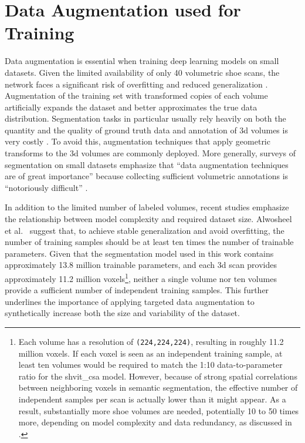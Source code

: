 \section{Data Augmentation used for Training}
Data augmentation is essential when training deep learning models on small datasets. Given the limited availability of only 40 volumetric shoe scans, the network faces a significant risk of overfitting and reduced generalization \cite{HaoDataAugmentation}. Augmentation of the training set with transformed copies of each volume artificially expands the dataset and better approximates the true data distribution. Segmentation tasks in particular usually rely heavily on both the quantity and the quality of ground truth data and annotation of \gls{3d} volumes is very costly \cite{SutassananonDataAugmentation}. To avoid this, augmentation techniques that apply geometric transforms to the \gls{3d} volumes are commonly deployed. More generally, surveys of segmentation on small datasets emphasize that \enquote{data augmentation techniques are of great importance} because collecting sufficient volumetric annotations is \enquote{notoriously difficult} \cite{AlomarDataAugmentation}.

\medskip

In addition to the limited number of labeled volumes, recent studies emphasize the relationship between model complexity and required dataset size. Alwosheel et al.~\cite{ALWOSHEEL2018167} suggest that, to achieve stable generalization and avoid overfitting, the number of training samples should be at least ten times the number of trainable parameters. Given that the segmentation model used in this work contains approximately 13.8 million trainable parameters, and each \gls{3d} scan provides approximately 11.2 million voxels\footnote{Each volume has a resolution of {\tt (224,224,224)}, resulting in roughly 11.2 million voxels. If each voxel is seen as an independent training sample, at least ten volumes would be required to match the 1:10 data-to-parameter ratio for the \gls{shvit_csa} model. However, because of strong spatial correlations between neighboring voxels in semantic segmentation, the effective number of independent samples per scan is actually lower than it might appear. As a result, substantially more shoe volumes are needed, potentially 10 to 50 times more, depending on model complexity and data redundancy, as discussed in \cite{ALWOSHEEL2018167}.}, neither a single volume nor ten volumes provide a sufficient number of independent training samples. This further underlines the importance of applying targeted data augmentation to synthetically increase both the size and variability of the dataset.

